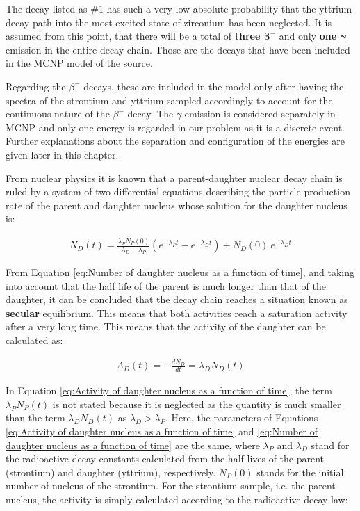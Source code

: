 The decay listed as \#\emph{$1$} has such a very low absolute probability that the yttrium decay path into the most excited state of zirconium has been neglected. It is assumed from this point, that there will be a total of \textbf{three $\boldsymbol{\beta}^-$} and only \textbf{one $\boldsymbol{\gamma}$} emission in the entire decay chain. Those are the decays that have been included in the MCNP model of the  source. 

Regarding the $\beta^-$ decays, these are included in the model only after having the spectra of the strontium and yttrium sampled accordingly to account for the continuous nature of the $\beta^-$ decay. The $\gamma$ emission is considered separately in MCNP and only one energy is regarded in our problem as it is a discrete event. Further explanations about the separation and configuration of the energies are given later in this chapter.

From nuclear physics it is known that a parent-daughter nuclear decay chain is ruled by a system of two differential equations describing the particle production rate of the parent and daughter nucleus whose solution \cite{NUK3Notes} for the daughter nucleus is:

\begin{align}
\label{eq:Number of daughter nucleus as a function of time}
    {N_{D}(t) = \frac{\lambda_{P} N_{P} (0)}{\lambda_{D}-\lambda_{P}} (e^{-\lambda_{P} t} -e^{-\lambda_{D} t} )+ N_{D}(0)} \: e^{-\lambda_{D} t}
\end{align}

From Equation \ref{eq:Number of daughter nucleus as a function of time}, and taking into account that the half life of the parent is much longer than that of the daughter, it can be concluded that the decay chain reaches a situation known as \textbf{secular} equilibrium. This means that both activities reach a saturation activity after a very long time. This means that the activity of the daughter can be calculated as:

\begin{align}
\label{eq:Activity of daughter nucleus as a function of time}
    {A_{D}(t) = -\frac{dN_{D}}{dt} =  \lambda_{D}N_{D}(t)}
\end{align}

In Equation \ref{eq:Activity of daughter nucleus as a function of time}, the term $\lambda_{P}N_{P}(t)$ is not stated because it is neglected as the quantity is much smaller than the term $\lambda_{D}N_{D}(t)$ as $\lambda_{D} > \lambda_{P}$. Here, the parameters of Equations \ref{eq:Activity of daughter nucleus as a function of time} and \ref{eq:Number of daughter nucleus as a function of time} are the same, where $\lambda_{P}$ and $\lambda_{D}$ stand for the radioactive decay constants calculated from the half lives of the parent (strontium) and daughter (yttrium), respectively. $N_{P} (0)$ stands for the initial number of nucleus of the strontium. For the strontium sample, i.e. the parent nucleus, the activity is simply calculated according to the radioactive decay law:


